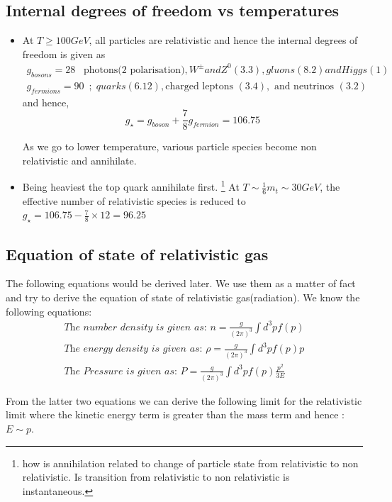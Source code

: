 \documentclass[12pt]{report}
\newcommand{\tit}[1]{\textit{#1}}
\newcommand{\fn}[1]{\footnote{#1}}
\begin{document}
\subsection*{Internal degrees of freedom vs temperatures}
\begin{itemize}
\item At $T \geq 100 GeV$, all particles are relativistic and hence the internal degrees of freedom is given as
\begin{eqnarray*}
g_{bosons}=28 \; \; \; \text{photons(2 polarisation)},W^{\pm} and Z^0 (3.3), gluons (8.2) and Higgs(1)\\
g_{fermions}=90 \; \ ; \; quarks(6.12),\text{charged leptons }(3.4), \text{ and neutrinos } (3.2)
\end{eqnarray*}
and hence,
\begin{equation}
g_\star=g_{boson} + \frac{7}{8}g_{fermion}=106.75
\end{equation}

As we go to lower temperature, various particle species become non relativistic and annihilate. 
\item Being heaviest the top quark annihilate first. \fn{how is annihilation related to change of particle state from relativistic to non relativistic. Is transition from relativistic to non relativistic is instantaneous.} At $T \sim \frac{1}{6}m_t \sim 30 GeV$, the effective number of relativistic species is reduced to $g_\star = 106.75 - \frac{7}{8} \times 12 = 96.25$
\end{itemize}
\subsection*{Equation of state of relativistic gas}
The following equations would be derived later. We use them as a matter of fact and try to derive the equation of state of relativistic gas(radiation). We know the following equations:
\begin{eqnarray}
\tit{The number density is given as: } n=\frac{g}{(2 \pi)^3} \int d^3p f(p)\\
\tit{The energy density is given as: } \rho=\frac{g}{(2 \pi)^3} \int d^3p f(p) p\\
\tit{The Pressure is given as: } P=\frac{g}{(2 \pi)^3} \int d^3p f(p) \frac{p^2}{3E}
\end{eqnarray}

From the latter two equations we can derive the following limit for the relativistic limit where the kinetic energy term is greater than the mass term and hence : $E \sim p$.
\end{document}
